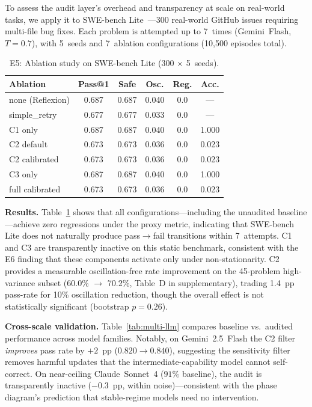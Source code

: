\documentclass{article}
\begin{document}
To assess the audit layer's overhead and transparency at scale on
real-world tasks, we apply it to SWE-bench
Lite~\cite{jimenez2024swebench}---300 real-world GitHub issues
requiring multi-file bug fixes.
Each problem is attempted up to 7~times (Gemini~Flash, $T{=}0.7$),
with 5~seeds and 7~ablation configurations (10{,}500 episodes total).

\begin{table}[t]
  \centering
  \caption{E5: Ablation study on SWE-bench Lite (300 $\times$ 5~seeds).}
  \label{tab:e5}
  \small
  \begin{tabular}{lccccc}
    \toprule
    Ablation & Pass@1 & Safe & Osc. & Reg. & Acc. \\
    \midrule
    none (Reflexion)  & 0.687 & 0.687 & 0.040 & 0.0 & ---   \\
    simple\_retry     & 0.677 & 0.677 & 0.033 & 0.0 & ---   \\
    C1 only           & 0.687 & 0.687 & 0.040 & 0.0 & 1.000 \\
    C2 default        & 0.673 & 0.673 & 0.036 & 0.0 & 0.023 \\
    C2 calibrated     & 0.673 & 0.673 & 0.036 & 0.0 & 0.023 \\
    C3 only           & 0.687 & 0.687 & 0.040 & 0.0 & 1.000 \\
    full calibrated   & 0.673 & 0.673 & 0.036 & 0.0 & 0.023 \\
    \bottomrule
  \end{tabular}
\end{table}

\textbf{Results.}
Table~\ref{tab:e5} shows that all configurations---including the
unaudited baseline---achieve zero regressions under the proxy metric,
indicating that SWE-bench Lite does not naturally produce
pass$\to$fail transitions within 7~attempts. C1 and C3 are
transparently inactive on this static benchmark, consistent with
the E6 finding that these components activate only under
non-stationarity. C2 provides a measurable oscillation-free rate
improvement on the 45-problem high-variance subset
(60.0\% $\to$ 70.2\%, Table~D in supplementary),
trading 1.4~pp pass-rate for 10\% oscillation reduction, though
the overall effect is not statistically significant (bootstrap
$p{=}0.26$).

\textbf{Cross-scale validation.}
Table~\ref{tab:multi-llm} compares baseline vs.\ audited performance
across model families. Notably, on Gemini~2.5~Flash the C2 filter
\emph{improves} pass rate by $+2$~pp ($0.820 \to 0.840$), suggesting
the sensitivity filter removes harmful updates that the intermediate-capability
model cannot self-correct. On near-ceiling Claude~Sonnet~4 ($91\%$ baseline),
the audit is transparently inactive ($-0.3$~pp, within noise)---consistent
with the phase diagram's prediction that stable-regime models need no intervention.
\end{document}
